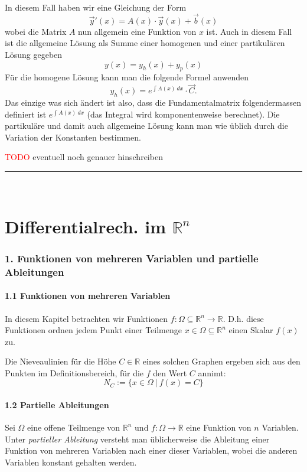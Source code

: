 \documentclass[a4paper,landscape,8pt]{extarticle}
\newcommand{\R}{\mathbb{R}}
\newcommand{\setsep}{\ \vert \ }
\newcommand{\todo}{\textcolor{red}{TODO }}
\newcommand{\sep}{\vspace{5pt}\noindent\hrule\vspace{5pt}}
\renewcommand*{\newpage}{ \ }
\begin{document}
\begin{multicols*}{4}
In diesem Fall haben wir eine Gleichung der Form 
\[ 
\vec{y}'(x) = A(x)\cdot\vec{y}(x) + \vec{b}(x) 
\] 
wobei die Matrix $A$ nun allgemein eine Funktion von $x$ ist. Auch in diesem
Fall ist die allgemeine Lösung als Summe einer homogenen und einer partikulären
Lösung gegeben
\[
y(x) = y_h(x) + y_p(x)
\] 
Für die homogene Lösung kann man die folgende Formel anwenden
\[ 
y_h(x) = e^{\int A(x) \ dx}\cdot \vec{C}.
\] 
Das einzige was sich ändert ist also, dass die Fundamentalmatrix folgendermassen
definiert ist $e^{\int A(x) \ dx}$ (das Integral wird komponentenweise
berechnet). Die partikuläre und damit auch allgemeine Lösung kann man wie üblich
durch die Variation der Konstanten bestimmen.

\begin{warmup}
\todo eventuell noch genauer hinschreiben
\end{warmup}

\sep



\newpage

\part{Differentialrech. im $\R^n$}

\section{1. Funktionen von mehreren Variablen und partielle Ableitungen}

\subsection{1.1 Funktionen von mehreren Variablen}

In diesem Kapitel betrachten wir Funktionen $f\colon\Omega\subseteq\R^n\to\R$.
D.h. diese Funktionen ordnen jedem Punkt einer Teilmenge
$x\in\Omega\subseteq\R^n$ einen Skalar $f(x)$ zu.

Die Nieveaulinien für die Höhe $C\in\R$ eines solchen Graphen ergeben sich aus
den Punkten im Definitionsbereich, für die $f$ den Wert $C$ annimt:
\[
N_C :=\{x\in\Omega \setsep f(x)=C\}
\]

\subsection{1.2 Partielle Ableitungen}

Sei $\Omega$ eine offene Teilmenge von $\R^n$ und $f\colon\Omega\to\R$ eine
Funktion von $n$ Variablen. Unter \emph{partieller Ableitung} versteht man
üblicherweise die Ableitung einer Funktion von mehreren Variablen nach einer
dieser Variablen, wobei die anderen Variablen konstant gehalten werden.


\end{multicols*}
\end{document}
